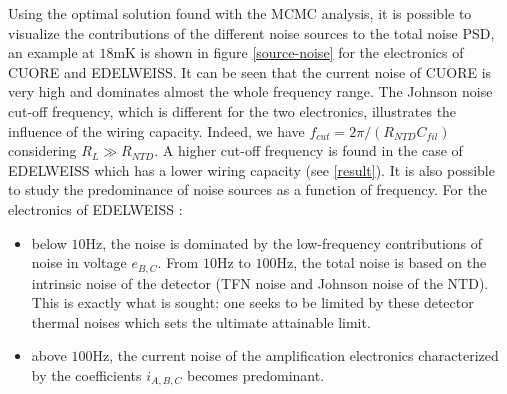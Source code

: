 Using the optimal solution found with the MCMC analysis, it is possible to visualize the contributions of the different noise sources to the total noise PSD, an example at $18$mK is shown in figure \ref{source-noise} for the electronics of CUORE and EDELWEISS. It can be seen that the current noise of CUORE is very high and dominates almost the whole frequency range. The Johnson noise cut-off frequency, which is different for the two electronics, illustrates the influence of the wiring capacity. Indeed, we have $f_{cut} = 2\pi/(R_{NTD} C_{fil})$ considering $R_L\gg R_{NTD}$. A higher cut-off frequency is found in the case of EDELWEISS which has a lower wiring capacity (see \ref{result}). It is also possible to study the predominance of noise sources as a function of frequency. For the electronics of EDELWEISS :
\begin{itemize}
\item below $10$Hz, the noise is dominated by the low-frequency contributions of noise in voltage $e_{B,C}$.
From $10$Hz to $100$Hz, the total noise is based on the intrinsic noise of the detector (TFN noise and Johnson noise of the NTD). This is exactly what is sought: one seeks to be limited by these detector thermal noises which sets the ultimate attainable limit.
\item above $100$Hz, the current noise of the amplification electronics characterized by the coefficients $i_{A,B,C}$ becomes predominant.
\end{itemize} 

